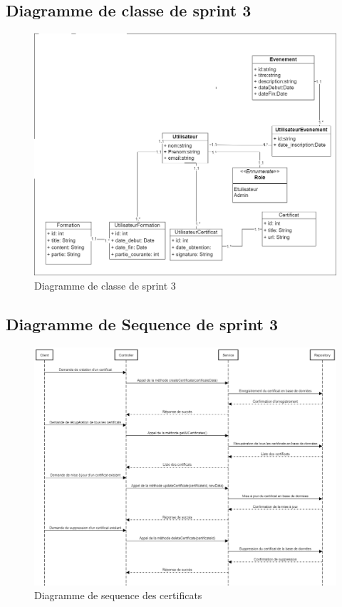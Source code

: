 \documentclass[a4paper, 11pt, openany]{report}
\begin{document}
\subsection{Diagramme de classe de sprint 3}

\begin{figure}[H]
\centering
\includegraphics[width=\textwidth]{assets/images/sprint2-class.png} 
\caption{Diagramme de classe de sprint 3}
\label{fig:s3_class}
\end{figure}

\subsection{Diagramme de Sequence de sprint 3}
\clearpage
\begin{figure}
\centering
\includegraphics[width=\textwidth]{assets/images/seq-certifs.png} 
\caption{Diagramme de sequence des certificats}
\label{fig:seq_certifs}
\end{figure}
\end{document}

